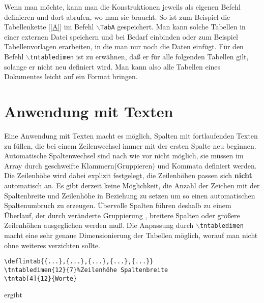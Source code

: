 \documentclass[10pt,a4paper]{article}%
\begin{document}
Wenn man möchte, kann man die Konstruktionen jeweils als eigenen Befehl
definieren und dort abrufen, wo man sie braucht. So ist zum Beispiel die
Tabellenkette [\ref{A}] im Befehl \texttt{$\backslash$TabA} gespeichert.
Man kann solche Tabellen in einer externen Datei speichern und bei Bedarf
einbinden oder zum Beispiel Tabellenvorlagen erarbeiten, in die man nur noch
die Daten einfügt.
Für den Befehl \texttt{$\backslash$tntabledimen} ist zu erwähnen, daß er für alle
folgenden Tabellen gilt, solange er nicht neu definiert wird. Man kann also
alle Tabellen eines Dokumentes leicht auf ein Format bringen.
\section{Anwendung mit Texten}
Eine Anwendung mit Texten macht es möglich, Spalten mit fortlaufenden Texten
zu füllen, die bei einem Zeilenwechsel immer mit der ersten Spalte neu beginnen.
Automatische Spaltenwechsel sind nach wie vor nicht möglich, sie müssen im
Array durch geschweifte Klammern(Gruppieren) und Kommata definiert werden.
Die Zeilenhöhe wird dabei explizit festgelegt, die Zeilenhöhen passen sich
\textbf{nicht} automatisch an. Es gibt derzeit keine Möglichkeit, die Anzahl
der Zeichen mit der Spaltenbreite und Zeilenhöhe in Beziehung zu setzen um so
einen automatischen Spaltenumbruch zu erzeugen. Übervolle Spalten führen
deshalb zu einem Überlauf, der durch veränderte Gruppierung , breitere Spalten
oder größere Zeilenhöhen ausgeglichen werden muß. Die Anpassung durch
\texttt{$\backslash$tntabledimen} macht eine sehr genaue Dimensionierung der
Tabellen möglich, worauf man nicht ohne weiteres verzichten
sollte. 
\begin{verbatim}
\deflintab{{...},{...},{...},{...},{...}}
\tntabledimen{12}{7}%Zeilenhöhe Spaltenbreite
\tntab[4]{12}{Worte}
\end{verbatim} ergibt
\renewcommand{\cellflush}{\raggedright}

\end{document}
